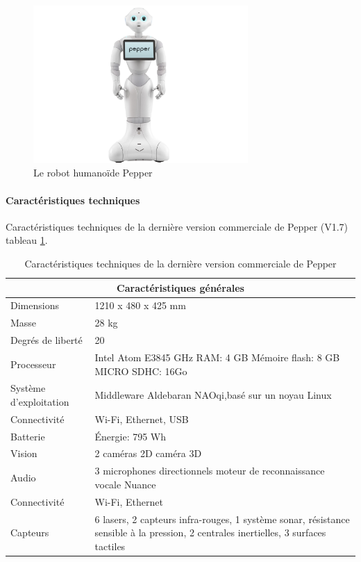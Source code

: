 \begin{figure}[H]
	\centering\includegraphics[height=6cm]{images/pepper.jpg}
	\caption{Le robot humanoïde Pepper}
	\label{fig:Robot humanoïde Pepper}
\end{figure}

\paragraph{Caractéristiques techniques}
Caractéristiques techniques de la dernière version commerciale de Pepper (V1.7) tableau \ref{tab: Caractéristiques techniques de Pepper}.

\begin{table}[H]
\begin{tabular}{ | l | p{10cm} | }
	\hline
	\multicolumn{2}{|c|}{Caractéristiques générales} \\
	\hline
	Dimensions & 1210 x 480 x 425 mm \\
	\hline 
	Masse & 28 kg \\
	\hline 
	Degrés de liberté  & 20 \\
	\hline
	Processeur & Intel Atom E3845 \newline 1.91 GHz \newline RAM: 4 GB \newline Mémoire flash: 8 GB \newline MICRO SDHC: 16Go  \\
	\hline
	Système d'exploitation & Middleware Aldebaran NAOqi,\newline basé sur un noyau Linux \\
	\hline
	Connectivité & Wi-Fi, Ethernet, USB \\
	\hline
	Batterie & Énergie: 795 Wh \\
	\hline 
	Vision & 2 caméras 2D \newline 1 caméra 3D \\
	\hline
	Audio & 3 microphones directionnels \newline moteur de reconnaissance vocale Nuance  \\
	\hline
	Connectivité & Wi-Fi, Ethernet \\
	\hline
	Capteurs & 6 lasers, 2 capteurs infra-rouges, 1 système sonar, résistance sensible à la pression, 2 centrales inertielles, 3 surfaces tactiles \\
	\hline
\end{tabular}
\caption[Caractéristiques techniques de Pepper]{Caractéristiques techniques de la dernière version commerciale  de Pepper}
\label {tab: Caractéristiques techniques de Pepper}
\cite{PepperTech}
\end{table}

